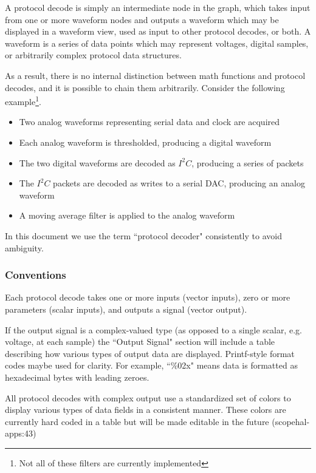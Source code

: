 \documentclass[11pt]{article}
\begin{document}
A protocol decode is simply an intermediate node in the graph, which takes input from one or more waveform nodes and
outputs a waveform which may be displayed in a waveform view, used as input to other protocol decodes, or both. A
waveform is a series of data points which may represent voltages, digital samples, or arbitrarily complex protocol data
structures.

As a result, there is no internal distinction between math functions and protocol decodes, and it is possible to chain
them arbitrarily. Consider the following example\footnote{Not all of these filters are currently implemented}.

\begin{itemize}
\item Two analog waveforms representing serial data and clock are acquired
\item Each analog waveform is thresholded, producing a digital waveform
\item The two digital waveforms are decoded as $I^2C$, producing a series of packets
\item The $I^2C$ packets are decoded as writes to a serial DAC, producing an analog waveform
\item A moving average filter is applied to the analog waveform
\end{itemize}

In this document we use the term ``protocol decoder" consistently to avoid ambiguity.

\subsubsection{Conventions}

Each protocol decode takes one or more inputs (vector inputs), zero or more parameters (scalar inputs), and outputs a
signal (vector output).

If the output signal is a complex-valued type (as opposed to a single scalar, e.g. voltage, at each sample) the
``Output Signal" section will include a table describing how various types of output data are displayed. Printf-style
format codes maybe used for clarity. For example, ``\%02x" means data is formatted as hexadecimal bytes with leading
zeroes.

All protocol decodes with complex output use a standardized set of colors to display various types of data fields in a
consistent manner. These colors are currently hard coded in a table but will be made editable in the future
(scopehal-apps:43)
\end{document}
